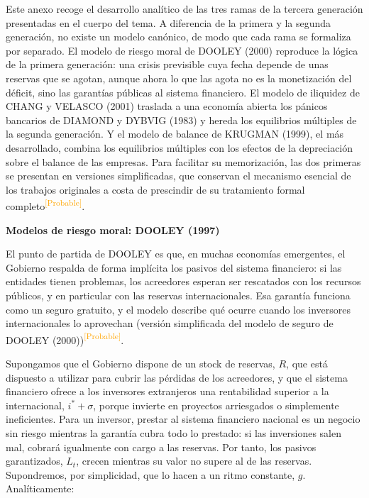 \documentclass[10pt,a4paper]{article}
\newcounter{anexo}
\begin{document}
Este anexo recoge el desarrollo analítico de las tres ramas de la tercera generación presentadas en el cuerpo del tema. A diferencia de la primera y la segunda generación, no existe un modelo canónico, de modo que cada rama se formaliza por separado. El modelo de riesgo moral de DOOLEY (2000) reproduce la lógica de la primera generación: una crisis previsible cuya fecha depende de unas reservas que se agotan, aunque ahora lo que las agota no es la monetización del déficit, sino las garantías públicas al sistema financiero. El modelo de iliquidez de CHANG y VELASCO (2001) traslada a una economía abierta los pánicos bancarios de DIAMOND y DYBVIG (1983) y hereda los equilibrios múltiples de la segunda generación. Y el modelo de balance de KRUGMAN (1999), el más desarrollado, combina los equilibrios múltiples con los efectos de la depreciación sobre el balance de las empresas. Para facilitar su memorización, las dos primeras se presentan en versiones simplificadas, que conservan el mecanismo esencial de los trabajos originales a costa de prescindir de su tratamiento formal completo\textcolor{orange}{\textsuperscript{[Probable]}}.


\textbf{Modelos de riesgo moral: DOOLEY (1997)}

El punto de partida de DOOLEY es que, en muchas economías emergentes, el Gobierno respalda de forma implícita los pasivos del sistema financiero: si las entidades tienen problemas, los acreedores esperan ser rescatados con los recursos públicos, y en particular con las reservas internacionales. Esa garantía funciona como un seguro gratuito, y el modelo describe qué ocurre cuando los inversores internacionales lo aprovechan (versión simplificada del modelo de seguro de DOOLEY (2000))\textcolor{orange}{\textsuperscript{[Probable]}}.

Supongamos que el Gobierno dispone de un stock de reservas, $R$, que está dispuesto a utilizar para cubrir las pérdidas de los acreedores, y que el sistema financiero ofrece a los inversores extranjeros una rentabilidad superior a la internacional, $i^*+\sigma$, porque invierte en proyectos arriesgados o simplemente ineficientes. Para un inversor, prestar al sistema financiero nacional es un negocio sin riesgo mientras la garantía cubra todo lo prestado: si las inversiones salen mal, cobrará igualmente con cargo a las reservas. Por tanto, los pasivos garantizados, $L_t$, crecen mientras su valor no supere al de las reservas. Supondremos, por simplicidad, que lo hacen a un ritmo constante, $g$. Analíticamente:
\end{document}
